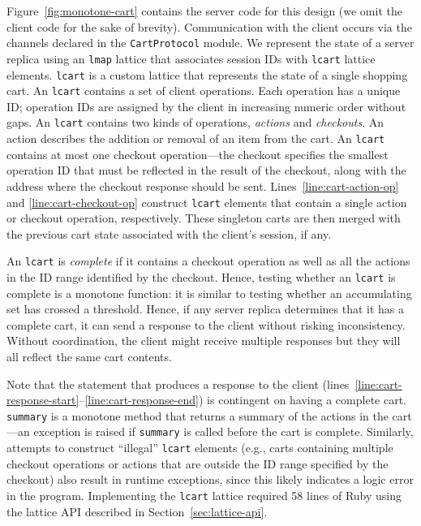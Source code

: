 
Figure~\ref{fig:monotone-cart} contains the server code for this design (we omit
the client code for the sake of brevity). Communication with the client occurs
via the channels declared in the \texttt{CartProtocol} module. We represent the
state of a server replica using an \texttt{lmap} lattice that associates session
IDs with \texttt{lcart} lattice elements. \texttt{lcart} is a custom lattice
that represents the state of a single shopping cart. An \texttt{lcart} contains
a set of client operations. Each operation has a unique ID; operation IDs are
assigned by the client in increasing numeric order without gaps. An
\texttt{lcart} contains two kinds of operations, \emph{actions} and
\emph{checkouts}. An action describes the addition or removal of an item from
the cart. An \texttt{lcart} contains at most one checkout operation---the
checkout specifies the smallest operation ID that must be reflected in the
result of the checkout, along with the address where the checkout response
should be sent.  Lines~\ref{line:cart-action-op} and \ref{line:cart-checkout-op}
construct \texttt{lcart} elements that contain a single action or checkout
operation, respectively. These singleton carts are then merged with the previous
cart state associated with the client's session, if any.

An \texttt{lcart} is \emph{complete} if it contains a checkout operation as well
as all the actions in the ID range identified by the checkout. Hence, testing
whether an \texttt{lcart} is complete is a monotone function: it is similar to
testing whether an accumulating set has crossed a threshold. Hence, if any
server replica determines that it has a complete cart, it can send a response to
the client without risking inconsistency. Without coordination, the client might
receive multiple responses but they will all reflect the same cart contents.

Note that the statement that produces a response to the client
(lines~\ref{line:cart-response-start}--\ref{line:cart-response-end}) is
contingent on having a complete cart. \texttt{summary} is a monotone method that
returns a summary of the actions in the cart---an exception is raised if
\texttt{summary} is called before the cart is complete. Similarly, attempts to
construct ``illegal'' \texttt{lcart} elements (e.g., carts containing multiple
checkout operations or actions that are outside the ID range specified by the
checkout) also result in runtime exceptions, since this likely indicates a logic
error in the program. Implementing the \texttt{lcart} lattice required 58 lines
of Ruby using the lattice API described in Section~\ref{sec:lattice-api}.

